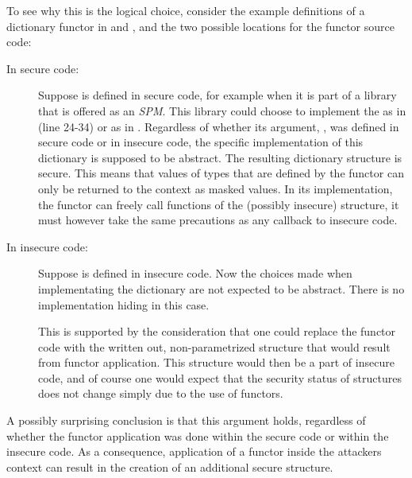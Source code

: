 \documentclass[10pt,a4paper,master=cws, masteroption=ai,english,inputenc=utf8]{kulemt}
\begin{document}
To see why this is the logical choice, consider the example definitions of a dictionary functor in  and , and the two possible locations for the functor source code:
\begin{description}
\item[In secure code:] 
Suppose  is defined in secure code, for example when it is part of a library that is offered as an \emph{SPM}.
This library could choose to implement the  as in  (line 24-34) or as in .
Regardless of whether its argument, , was defined in secure code or in insecure code, the specific implementation of this dictionary is supposed to be abstract.
The resulting dictionary structure is secure.
This means that values of types that are defined by the functor can only be returned to the context as masked values.
In its implementation, the functor can freely call functions of the (possibly insecure) structure, it must however take the same precautions as any callback to insecure code.
\item[In insecure code:] Suppose  is defined in insecure code.
Now the choices made when implementating the dictionary are not expected to be abstract. There is no implementation hiding in this case.

This is supported by the consideration that one could replace the functor code with the written out, non-parametrized structure that would result from functor application.
This structure would then be a part of insecure code, and of course one would expect that the security status of structures does not change simply due to the use of functors.
\end{description}

A possibly surprising conclusion is that this argument holds, regardless of whether the functor application was done within the secure code or within the insecure code.
As a consequence, application of a functor inside the attackers context can result in the creation of an additional secure structure.
\end{document}

